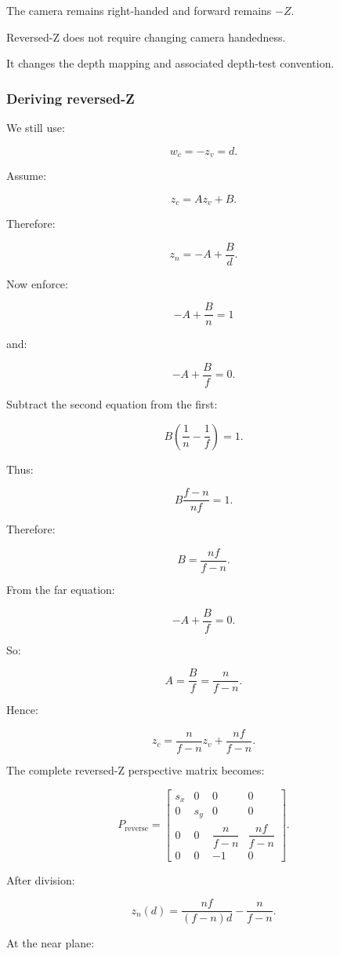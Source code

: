 The camera remains right-handed and forward remains \(-Z\).

Reversed-Z does not require changing camera handedness.

It changes the depth mapping and associated depth-test convention.

\subsubsection{Deriving reversed-Z}\label{deriving-reversed-z}

We still use:

\[
 w_c=-z_v=d.
\]

Assume:

\[
 z_c=Az_v+B.
\]

Therefore:

\[
 z_n=-A+\frac Bd.
\]

Now enforce:

\[
 -A+\frac Bn=1
\]

and:

\[
 -A+\frac Bf=0.
\]

Subtract the second equation from the first:

\[
 B\left(\frac1n-\frac1f\right)=1.
\]

Thus:

\[
 B\frac{f-n}{nf}=1.
\]

Therefore:

\[
 \boxed{ B=\frac{nf}{f-n} }.
\]

From the far equation:

\[
 -A+\frac Bf=0.
\]

So:

\[
 A=\frac Bf=\frac n{f-n}.
\]

Hence:

\[
 \boxed{ z_c= \frac n{f-n}z_v+ \frac{nf}{f-n} }.
\]

The complete reversed-Z perspective matrix becomes:

\[
 \boxed{ P_{\mathrm{reverse}}= \begin{bmatrix} s_x&0&0&0\\ 0&s_y&0&0\\ 0&0&\dfrac n{f-n}&\dfrac{nf}{f-n}\\ 0&0&-1&0 \end{bmatrix} }.
\]

After division:

\[
 \boxed{ z_n(d)= \frac{nf}{(f-n)d} -\frac n{f-n} }.
\]

At the near plane:

